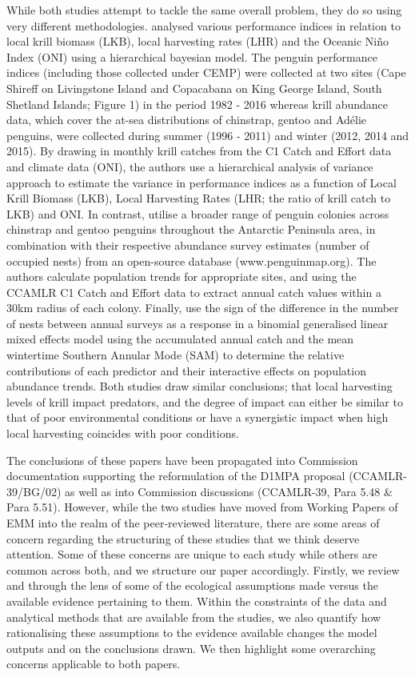 \documentclass[]{elsarticle} %
\begin{document}
While both studies attempt to tackle the same overall problem, they do
so using very different methodologies. \citet{Watters2020} analysed
various performance indices in relation to local krill biomass (LKB),
local harvesting rates (LHR) and the Oceanic Niño Index (ONI) using a
hierarchical bayesian model. The penguin performance indices (including
those collected under CEMP) were collected at two sites (Cape Shireff on
Livingstone Island and Copacabana on King George Island, South Shetland
Islands; Figure 1) in the period 1982 - 2016 whereas krill abundance
data, which cover the at-sea distributions of chinstrap, gentoo and
Adélie penguins, were collected during summer (1996 - 2011) and winter
(2012, 2014 and 2015). By drawing in monthly krill catches from the C1
Catch and Effort data and climate data (ONI), the authors use a
hierarchical analysis of variance approach to estimate the variance in
performance indices as a function of Local Krill Biomass (LKB), Local
Harvesting Rates (LHR; the ratio of krill catch to LKB) and ONI. In
contrast, \citet{Kruger2021} utilise a broader range of penguin colonies
across chinstrap and gentoo penguins throughout the Antarctic Peninsula
area, in combination with their respective abundance survey estimates
(number of occupied nests) from an open-source database
(www.penguinmap.org). The authors calculate population trends for
appropriate sites, and using the CCAMLR C1 Catch and Effort data to
extract annual catch values within a 30km radius of each colony.
Finally, \citet{Kruger2021} use the sign of the difference in the number
of nests between annual surveys as a response in a binomial generalised
linear mixed effects model using the accumulated annual catch and the
mean wintertime Southern Annular Mode (SAM) to determine the relative
contributions of each predictor and their interactive effects on
population abundance trends. Both studies draw similar conclusions; that
local harvesting levels of krill impact predators, and the degree of
impact can either be similar to that of poor environmental conditions or
have a synergistic impact when high local harvesting coincides with poor
conditions.

The conclusions of these papers have been propagated into Commission
documentation supporting the reformulation of the D1MPA proposal
(CCAMLR-39/BG/02) as well as into Commission discussions (CCAMLR-39,
Para 5.48 \& Para 5.51). However, while the two studies have moved from
Working Papers of EMM into the realm of the peer-reviewed literature,
there are some areas of concern regarding the structuring of these
studies that we think deserve attention. Some of these concerns are
unique to each study while others are common across both, and we
structure our paper accordingly. Firstly, we review \citet{Watters2020}
and \citet{Kruger2021} through the lens of some of the ecological
assumptions made versus the available evidence pertaining to them.
Within the constraints of the data and analytical methods that are
available from the studies, we also quantify how rationalising these
assumptions to the evidence available changes the model outputs and on
the conclusions drawn. We then highlight some overarching concerns
applicable to both papers.
\end{document}
